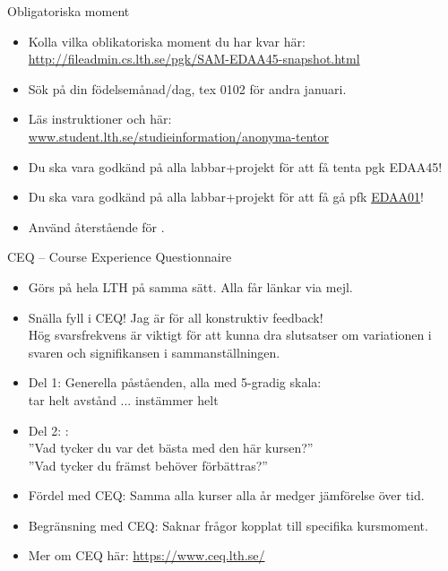 
\begin{Slide}{Obligatoriska moment}\SlideFontSmall
\begin{itemize}
\item Kolla vilka oblikatoriska moment du har kvar här:
\url{http://fileadmin.cs.lth.se/pgk/SAM-EDAA45-snapshot.html}
\item Sök på din födelsemånad/dag, tex 0102 för andra januari.
\item Läs  instruktioner  och  här: \\
\href{http://www.student.lth.se/studieinformation/anonyma-tentor/}{www.student.lth.se/studieinformation/anonyma-tentor}
\item Du ska vara godkänd på alla labbar+projekt för att få tenta pgk EDAA45!
\item Du ska vara godkänd på alla labbar+projekt för att få gå pfk \href{http://cs.lth.se/edaa01vt}{EDAA01}!
\item Använd återstående  för .
\end{itemize}
\end{Slide}

\begin{Slide}{CEQ -- Course Experience Questionnaire}\SlideFontSmall
\begin{itemize}
\item Görs på hela LTH på samma sätt. Alla får länkar via mejl.
\item Snälla fyll i CEQ! Jag är  för all konstruktiv feedback! \\ Hög svarsfrekvens är viktigt för att kunna dra slutsatser om variationen i svaren och signifikansen i sammanställningen.
\item Del 1: Generella påståenden, alla med 5-gradig skala: \\ tar helt avstånd ... instämmer helt
\item Del 2: : \\
''Vad  tycker  du  var  det  bästa  med  den här  kursen?'' \\
''Vad  tycker  du  främst  behöver  förbättras?''
\item Fördel med CEQ: Samma alla kurser alla år medger jämförelse över tid.
\item Begränsning med CEQ: Saknar frågor kopplat till specifika kursmoment.
\item Mer om CEQ här: \url{https://www.ceq.lth.se/}
\end{itemize}
\end{Slide}

